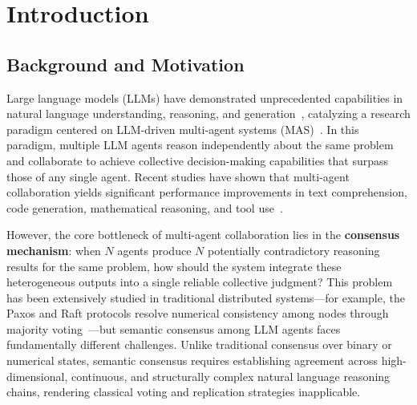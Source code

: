 \documentclass[12pt,a4paper]{article}
\begin{document}
\begin{abstract}
On 10 reasoning benchmark datasets including StrategyQA, GSM-Hard, and MMLU-Hard, six systematic experiments comprehensively validate the framework's effectiveness across six dimensions: communication mode comparison, parameter optimization, heterogeneous robustness, trust component ablation, cross-dataset generalization, and scalability. Experiments employ DeepSeek (strong model) and Zhipu GLM-4-Flash (weak/free model) as heterogeneous LLM backends, combined with a local Sentence-Transformer embedding encoder, for end-to-end validation on real LLM systems.

\noindent\textbf{Keywords:} multi-agent semantic consensus; AEIC semantic decomposition; Stackelberg game; decentralized collaboration; cross-layer trust evaluation; adversarial robustness
\end{abstract}

\newpage

\section{Introduction}\label{sec:intro}

\subsection{Background and Motivation}

Large language models (LLMs) have demonstrated unprecedented capabilities in natural language understanding, reasoning, and generation~\cite{brown2020language,openai2023gpt4}, catalyzing a research paradigm centered on LLM-driven multi-agent systems (MAS)~\cite{wooldridge1995intelligent,talebirad2023multi,tran2025multi}. In this paradigm, multiple LLM agents reason independently about the same problem and collaborate to achieve collective decision-making capabilities that surpass those of any single agent. Recent studies have shown that multi-agent collaboration yields significant performance improvements in text comprehension, code generation, mathematical reasoning, and tool use~\cite{chen2023agentverse,hong2023metagpt,wu2023autogen}.

However, the core bottleneck of multi-agent collaboration lies in the \textbf{consensus mechanism}: when $N$ agents produce $N$ potentially contradictory reasoning results for the same problem, how should the system integrate these heterogeneous outputs into a single reliable collective judgment? This problem has been extensively studied in traditional distributed systems---for example, the Paxos and Raft protocols resolve numerical consistency among nodes through majority voting~\cite{olfati2007consensus}---but semantic consensus among LLM agents faces fundamentally different challenges. Unlike traditional consensus over binary or numerical states, semantic consensus requires establishing agreement across high-dimensional, continuous, and structurally complex natural language reasoning chains, rendering classical voting and replication strategies inapplicable.
\end{document}
